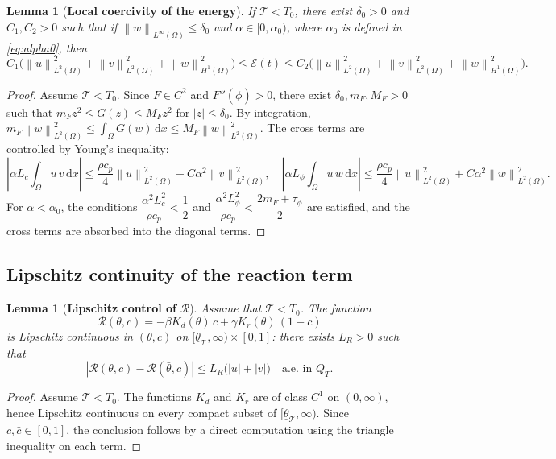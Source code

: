 \documentclass[final,1p,times]{elsarticle}
\newcommand{\dx}{\,\mathrm{d}x}
\numberwithin{equation}{section}
\newtheorem{lemma}[theorem]{Lemma}
\newcommand{\norm}[1]{\left\|#1\right\|}
\newcommand{\abs}[1]{\left|#1\right|}
\begin{document}
	\begin{lemma}[\textbf{Local coercivity of the energy}]
		\label{lem:coercive}
		If $\mathcal T<T_0$, there exist $\delta_0 > 0$ and $C_1, C_2 > 0$ such that
		if $\norm{w}_{L^\infty(\Omega)} \leq \delta_0$ and $\alpha \in [0,\alpha_0)$, where $\alpha_0$ is defined in \eqref{eq:alpha0}, then
		\[
		C_1\bigl(\norm{u}_{L^2(\Omega)}^2 + \norm{v}_{L^2(\Omega)}^2 + \norm{w}_{H^1(\Omega)}^2\bigr)
		\leq \mathcal{E}(t)
		\leq C_2\bigl(\norm{u}_{L^2(\Omega)}^2 + \norm{v}_{L^2(\Omega)}^2 + \norm{w}_{H^1(\Omega)}^2\bigr).
		\]
	\end{lemma}
	
	\begin{proof}
		Assume $\mathcal T<T_0$. Since $F \in C^2$ and $F''(\bar\phi) > 0$, there exist $\delta_0, m_F, M_F > 0$ such that
		$m_F z^2 \leq G(z) \leq M_F z^2$ for $|z| \leq \delta_0$. By integration,
		$m_F\norm{w}_{L^2(\Omega)}^2 \leq \int_\Omega G(w)\dx \leq M_F\norm{w}_{L^2(\Omega)}^2$.
		The cross terms are controlled by Young's inequality:
		\[
		\abs{\alpha L_c \int_\Omega u\,v\dx}
		\leq \frac{\rho c_p}{4}\norm{u}_{L^2(\Omega)}^2 + C\alpha^2\norm{v}_{L^2(\Omega)}^2,
		\quad
		\abs{\alpha L_\phi \int_\Omega u\,w\dx}
		\leq \frac{\rho c_p}{4}\norm{u}_{L^2(\Omega)}^2 + C\alpha^2\norm{w}_{L^2(\Omega)}^2.
		\]
		 For $\alpha < \alpha_0$, the conditions
		$\dfrac{\alpha^2 L_c^2}{\rho c_p} < \dfrac{1}{2}$
		and
		$\dfrac{\alpha^2 L_\phi^2}{\rho c_p} < \dfrac{2m_F + \tau_\phi}{2}$
		are satisfied, and the cross terms are absorbed into the diagonal terms.
	\end{proof}
	
	\subsection{Lipschitz continuity of the reaction term}
	
	\begin{lemma}[\textbf{Lipschitz control of} $\mathcal{R}$]
		\label{lem:lipschitzR}
		Assume that $\mathcal T<T_0$. The function
		$$\mathcal{R}(\theta,c) = -\beta K_d(\theta)\,c + \gamma K_r(\theta)\,(1-c)$$
		is Lipschitz continuous in $(\theta, c)$ on $[\underline\theta_{\mathcal{T}}, \infty) \times [0,1]$: there
		exists $L_R > 0$ such that
		\[
		|\mathcal{R}(\theta,c) - \mathcal{R}(\bar\theta,\bar c)|
		\leq L_R\bigl(|u| + |v|\bigr)
		\quad\text{a.e. in } Q_T.
		\]
	\end{lemma}
	
	\begin{proof}
		Assume $\mathcal T<T_0$. The functions $K_d$ and $K_r$ are of class $C^1$ on $(0,\infty)$, hence Lipschitz continuous
		on every compact subset of $[\underline\theta_{\mathcal{T}}, \infty)$. Since $c, \bar c \in [0,1]$, the conclusion
		follows by a direct computation using the triangle inequality on each term.
	\end{proof}
	
\end{document}

